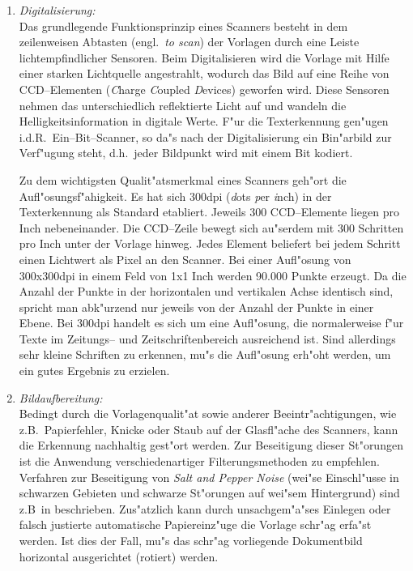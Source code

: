 \begin{enumerate}

\item {\em Digitalisierung:}\\
Das grundlegende Funktionsprinzip eines Scanners besteht in dem zeilenweisen 
Abtasten (engl.\ {\em to scan\/}) der
Vorlagen durch eine Leiste lichtempfindlicher Sensoren. 
Beim Digitalisieren wird die Vorlage mit Hilfe einer starken
Lichtquelle angestrahlt, wodurch das Bild auf eine Reihe von CCD--Elementen
({\sl C\/}harge {\sl C\/}oupled {\sl D\/}evices) geworfen wird. Diese
Sensoren nehmen das unterschiedlich reflektierte Licht auf und wandeln
die Helligkeitsinformation in digitale Werte. F"ur die Texterkennung
gen"ugen i.d.R.\ Ein--Bit--Scanner, so da"s nach der Digitalisierung ein
Bin"arbild  zur Verf"ugung steht, d.h.~jeder Bildpunkt wird mit einem Bit kodiert.

Zu dem wichtigsten Qualit"atsmerkmal eines Scanners geh"ort die Aufl"osungsf"ahigkeit. 
Es hat sich 300dpi ({\em d\/}ots {\em p\/}er {\em i\/}nch) 
in der Texterkennung als Standard etabliert. 
Jeweils 300 CCD--Elemente liegen pro Inch nebeneinander.
Die CCD--Zeile bewegt sich au"serdem mit 300 Schritten pro Inch unter der Vorlage hinweg. Jedes
Element beliefert bei jedem Schritt einen Lichtwert als Pixel an den Scanner. Bei einer Aufl"osung
von 300x300dpi in einem Feld von 1x1 Inch werden 90.000 Punkte erzeugt. Da die Anzahl
der Punkte in der horizontalen und vertikalen Achse identisch sind, spricht man abk"urzend
nur jeweils von der Anzahl der Punkte in einer Ebene. Bei 300dpi handelt es sich um eine
Aufl"osung, die normalerweise f"ur Texte im Zeitungs-- und Zeitschriftenbereich ausreichend ist.
Sind allerdings sehr kleine Schriften zu erkennen, mu"s die Aufl"osung erh"oht werden, um ein gutes
Ergebnis zu erzielen.

\item {\em Bildaufbereitung:}\\
Bedingt durch die Vorlagenqualit"at sowie anderer Beeintr"achtigungen,
wie z.B.\ Papierfehler, Knicke oder Staub auf der Glasfl"ache des Scanners,
kann die Erkennung nachhaltig gest"ort werden. Zur Beseitigung dieser
St"orungen ist die Anwendung verschiedenartiger Filter\-ungs\-methoden zu empfehlen. Verfahren
zur Beseitigung von {\em Salt and Pepper Noise\/} (wei"se Einschl"usse in schwarzen Gebieten
und schwarze St"orungen auf wei"sem Hintergrund) sind z.B\ in \cite{Bartneck90} beschrieben.
Zus"atzlich kann durch unsachgem"a"ses Einlegen oder falsch justierte 
automatische Papiereinz"uge die Vorlage schr"ag erfa"st werden. 
Ist dies der Fall, mu"s das schr"ag vorliegende Dokumentbild horizontal ausgerichtet (rotiert) werden.


\end{enumerate}
